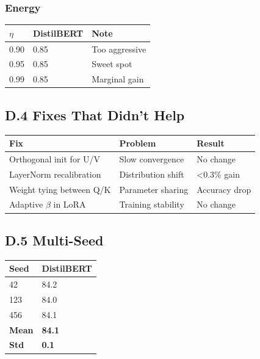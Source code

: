 \subsubsection{Energy}

\begin{table}[H]
\centering
\small
\begin{tabular}{lll}
\toprule
\textbf{$\eta$} & \textbf{DistilBERT} & \textbf{Note} \\
\midrule
0.90 & 0.85 & Too aggressive \\
0.95 & 0.85 & Sweet spot \\
0.99 & 0.85 & Marginal gain \\
\bottomrule
\end{tabular}
\end{table}

\subsection{D.4 Fixes That Didn't Help}

\begin{table}[H]
\centering
\small
\begin{tabular}{lll}
\toprule
\textbf{Fix} & \textbf{Problem} & \textbf{Result} \\
\midrule
Orthogonal init for U/V & Slow convergence & No change \\
LayerNorm recalibration & Distribution shift & <0.3\% gain \\
Weight tying between Q/K & Parameter sharing & Accuracy drop \\
Adaptive $\beta$ in LoRA & Training stability & No change \\
\bottomrule
\end{tabular}
\end{table}

\subsection{D.5 Multi-Seed}

\begin{table}[H]
\centering
\small
\begin{tabular}{ll}
\toprule
\textbf{Seed} & \textbf{DistilBERT} \\
\midrule
42 & 84.2 \\
123 & 84.0 \\
456 & 84.1 \\
\textbf{Mean} & \textbf{84.1} \\
\textbf{Std} & \textbf{0.1} \\
\bottomrule
\end{tabular}
\end{table}

